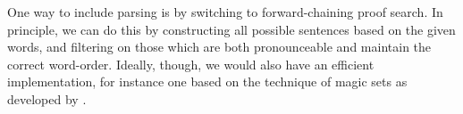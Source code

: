 \documentclass[a4paper]{article}
\begin{document}
One way to include parsing is by switching to forward-chaining proof
search. In principle, we can do this by constructing all possible
sentences based on the given words, and filtering on those which are
both pronounceable and maintain the correct word-order. Ideally,
though, we would also have an efficient implementation, for instance
one based on the technique of magic sets as developed by
\citet{bancilhon1985}.

%
%
\end{document}
